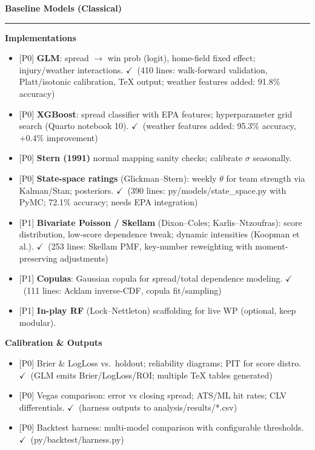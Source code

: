 \documentclass[11pt]{article}
\newcommand{\block}[1]{\par\noindent\textbf{#1}\par\vspace{0.25em}}
\newcommand{\milestone}[1]{\vspace{0.5em}\noindent\textbf{\large #1}\par\vspace{0.25em}\hrule\vspace{0.5em}}
\newcommand{\done}{\textcolor{green!60!black}{\(\checkmark\)}}
\newcommand{\prio}[1]{\textcolor{blue!70!black}{[#1]}}
\begin{document}
\milestone{Baseline Models (Classical)}
\block{Implementations}
\begin{itemize}
  \item \prio{P0} \textbf{GLM}: spread $\to$ win prob (logit), home-field fixed effect; injury/weather interactions. \done\ (410 lines: walk-forward validation, Platt/isotonic calibration, TeX output; weather features added: 91.8\% accuracy)
  \item \prio{P0} \textbf{XGBoost}: spread classifier with EPA features; hyperparameter grid search (Quarto notebook 10). \done\ (weather features added: 95.3\% accuracy, +0.4\% improvement)
  \item \prio{P0} \textbf{Stern (1991)} normal mapping sanity checks; calibrate $\sigma$ seasonally.
  \item \prio{P0} \textbf{State-space ratings} (Glickman--Stern): weekly $\theta$ for team strength via Kalman/Stan; posteriors. \done\ (390 lines: py/models/state\_space.py with PyMC; 72.1\% accuracy; needs EPA integration)
  \item \prio{P1} \textbf{Bivariate Poisson / Skellam} (Dixon--Coles; Karlis--Ntzoufras): score distribution, low-score dependence tweak; dynamic intensities (Koopman et al.). \done\ (253 lines: Skellam PMF, key-number reweighting with moment-preserving adjustments)
  \item \prio{P1} \textbf{Copulas}: Gaussian copula for spread/total dependence modeling. \done\ (111 lines: Acklam inverse-CDF, copula fit/sampling)
  \item \prio{P1} \textbf{In-play RF} (Lock--Nettleton) scaffolding for live WP (optional, keep modular).
\end{itemize}

\block{Calibration \& Outputs}
\begin{itemize}
  \item \prio{P0} Brier \& LogLoss vs.\ holdout; reliability diagrams; PIT for score distro. \done\ (GLM emits Brier/LogLoss/ROI; multiple TeX tables generated)
  \item \prio{P0} Vegas comparison: error vs closing spread; ATS/ML hit rates; CLV differentials. \done\ (harness outputs to analysis/results/*.csv)
  \item \prio{P0} Backtest harness: multi-model comparison with configurable thresholds. \done\ (py/backtest/harness.py)
\end{itemize}
\end{document}
